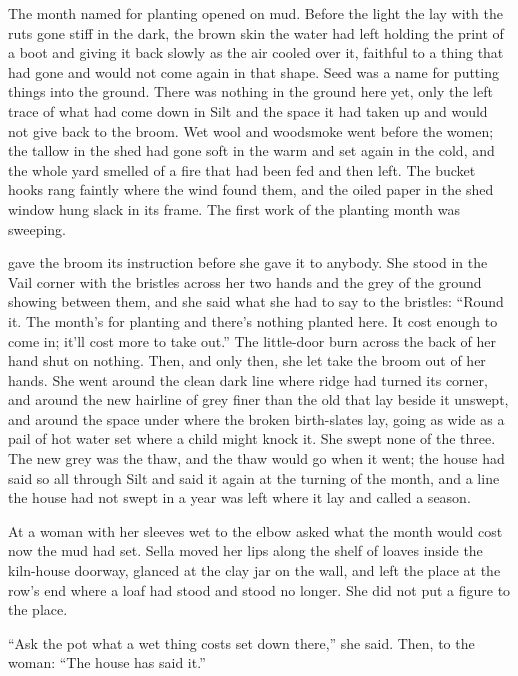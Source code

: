 
The month named for planting opened on mud. Before the light the  lay with the ruts gone stiff in the dark, the brown skin the water had left holding the print of a boot and giving it back slowly as the air cooled over it, faithful to a thing that had gone and would not come again in that shape. Seed was a name for putting things into the ground. There was nothing in the ground here yet, only the left trace of what had come down in Silt and the space it had taken up and would not give back to the broom. Wet wool and woodsmoke went before the women; the tallow in the shed had gone soft in the warm and set again in the cold, and the whole yard smelled of a fire that had been fed and then left. The bucket hooks rang faintly where the wind found them, and the oiled paper in the shed window hung slack in its frame. The first work of the planting month was sweeping.

 gave the broom its instruction before she gave it to anybody. She stood in the Vail corner with the bristles across her two hands and the grey of the ground showing between them, and she said what she had to say to the bristles: “Round it. The month's for planting and there's nothing planted here. It cost enough to come in; it'll cost more to take out.” The little-door burn across the back of her hand shut on nothing. Then, and only then, she let  take the broom out of her hands. She went around the clean dark line where  ridge had turned its corner, and around the new hairline of grey finer than the old that lay beside it unswept, and around the space under  where the broken birth-slates lay, going as wide as a pail of hot water set where a child might knock it. She swept none of the three. The new grey was the thaw, and the thaw would go when it went; the house had said so all through Silt and said it again at the turning of the month, and a line the house had not swept in a year was left where it lay and called a season.

At  a woman with her sleeves wet to the elbow asked what the month would cost now the mud had set. Sella moved her lips along the shelf of loaves inside the kiln-house doorway, glanced at the clay jar on the wall, and left the place at the row's end where a loaf had stood and stood no longer. She did not put a figure to the place.

“Ask the pot what a wet thing costs set down there,” she said. Then, to the woman: “The house has said it.”

